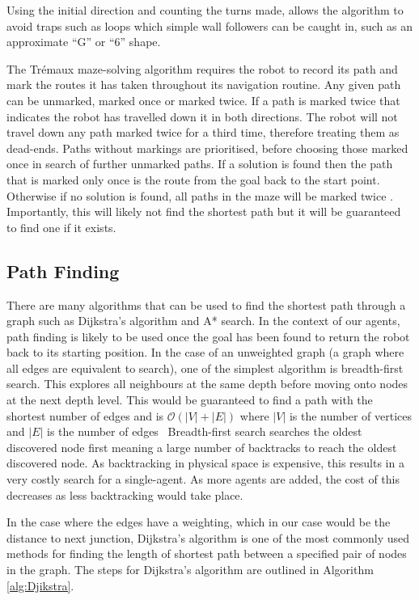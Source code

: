 Using the initial direction and counting the turns made, allows the 
algorithm to avoid traps such as loops which simple wall followers can be caught in, such as an approximate ``G'' or ``6'' shape.

The Trémaux maze-solving algorithm requires the robot to record its 
path and mark the routes it has taken throughout its navigation routine. Any 
given path  can be unmarked, marked once or marked twice. If a path is marked 
twice that indicates the robot has travelled down it in both directions. The 
robot will not travel down any path marked twice for a third time, therefore 
treating them as dead-ends. Paths without markings are prioritised, before 
choosing those marked once in search of further unmarked paths. If a 
solution is found then the path that is marked only once is the route 
from the goal back to the start point. Otherwise if no solution is found,
all paths in the maze will be marked twice \cite{even2011graph}.
Importantly, this will likely not find the shortest path but it will be 
guaranteed to find one if it exists.

\subsection{Path Finding}\label{litreview/maze/path}
There are many algorithms that can be used to find the shortest path 
through a graph such as Dijkstra's algorithm and A* search. In the 
context of our agents, path finding is likely to be used once 
the goal has been found to return the robot back to its starting 
position. In the case of an unweighted graph (a graph where all edges are 
equivalent to search), one of the simplest algorithm 
is breadth-first search. This explores all neighbours at the same depth 
before moving onto nodes at the next depth level. This would be guaranteed 
to find a path with the shortest number of edges and is $\mathcal{O}(|V| + |E|)$ 
where $|V|$ is the number of vertices and $|E|$ is the number of edges~\cite{cormen2009introduction}
Breadth-first search searches the oldest discovered node first meaning 
a large number of backtracks to reach the oldest discovered node. As 
backtracking in physical space is expensive, this results in a very 
costly search for a single-agent. As more agents are added, the cost of this 
decreases as less backtracking would take place. 

In the case where the edges have a weighting, which in our case would be the 
distance to next junction, Dijkstra's algorithm is one 
of the most commonly used methods for finding the length of shortest path between a specified pair of nodes in the graph. The steps for Dijkstra's algorithm are outlined in Algorithm \ref{alg:Djikstra}.

